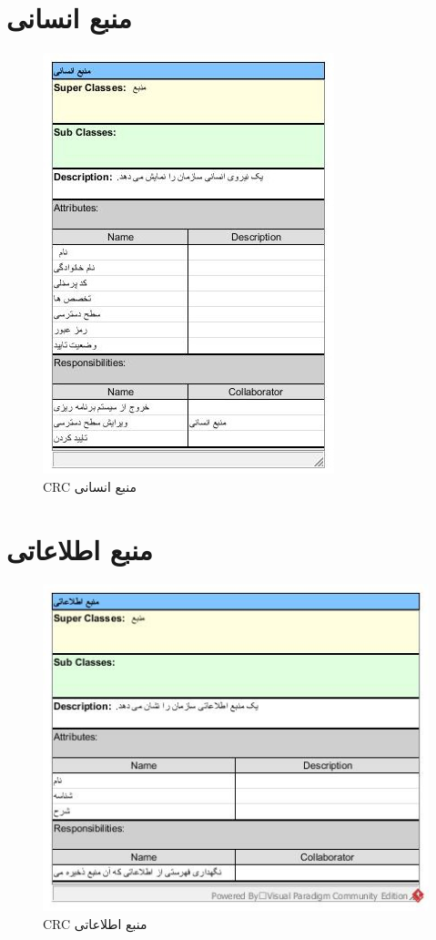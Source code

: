 \section{منبع انسانی}
\begin{figure}[H]
	\centering
	\includegraphics[scale=1]{img/crc/HumanResource}
	\caption{CRC منبع انسانی }
\end{figure}

\section{منبع اطلاعاتی}
\begin{figure}[H]
	\centering
	\includegraphics[scale=0.9]{img/crc/InformationResource}
	\caption{CRC منبع اطلاعاتی }
\end{figure}


